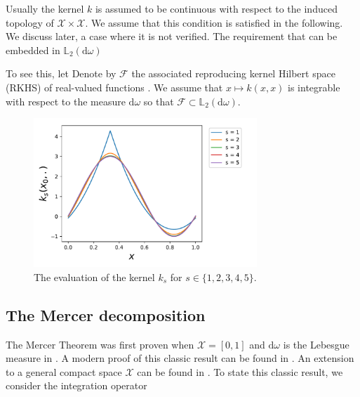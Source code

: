 \documentclass[twoside,11pt]{book}
\DeclareMathOperator{\Span}{\mathrm{Span}}
\begin{document}
Usually the kernel $k$ is assumed to be continuous with respect to the induced topology of $\mathcal{X} \times \mathcal{X}$. We assume that this condition is satisfied in the following. We discuss later, a case where it is not verified.
The requirement that can be embedded in $\mathbb{L}_{2}(\mathrm{d}\omega)$


 To see this, let  Denote by $\mathcal{F}$ the associated reproducing kernel Hilbert space (RKHS) of real-valued functions \cite{BeTh11}. We assume that $x \mapsto k(x,x)$ is integrable with respect to the measure $\mathrm{d}\omega$ so that $\mathcal{F} \subset \mathbb{L}_{2}(\mathrm{d}\omega)$.




%
 
\begin{figure}[]
    \centering
\includegraphics[width= 0.75\textwidth]{img/Sobolev/Bernoulli_kernels_same_node_s_1_5.pdf}
\caption{The evaluation of the kernel $k_{s}$ for $s \in \{1,2,3,4,5\}$.
\label{fig:periodic_sobolev_kernel}}
\end{figure}



\subsection{The Mercer decomposition}
\label{subsec:mercer}
The Mercer Theorem was first proven when $\mathcal{X} = [0,1]$ and $\mathrm{d}\omega$ is the Lebesgue measure in \cite{Mer1909}.
A modern proof of this classic result can be found in \cite{Lax02}. An extension to a general compact space $\mathcal{X}$ can be  found in \cite{CuZh07}. To state this classic result, we consider the integration operator
\end{document}
